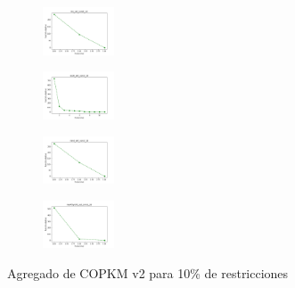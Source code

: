 \begin{figure}[H]
\begin{subfigure}
    \end{subfigure}
    \hfill
    \begin{subfigure}
        \centering
        \includegraphics[width=0.234\textwidth]{img/copkm2/iris_set_const_10_3773969821_cost.png}
    \end{subfigure}
    \hfill
    \begin{subfigure}
        \centering
        \includegraphics[width=0.234\textwidth]{img/copkm2/ecoli_set_const_10_3773969821_cost.png}
    \end{subfigure}
    \hfill
    \begin{subfigure}
        \centering
        \includegraphics[width=0.234\textwidth]{img/copkm2/rand_set_const_10_3773969821_cost.png}
    \end{subfigure}
    \hfill
    \begin{subfigure}
        \centering
        \includegraphics[width=0.234\textwidth]{img/copkm2/newthyroid_set_const_10_3773969821_cost.png}
    \end{subfigure}
    \caption{Agregado de COPKM v2 para 10\% de restricciones}
\end{figure}


\vspace*{\fill}
\newpage
\vspace*{\fill}

